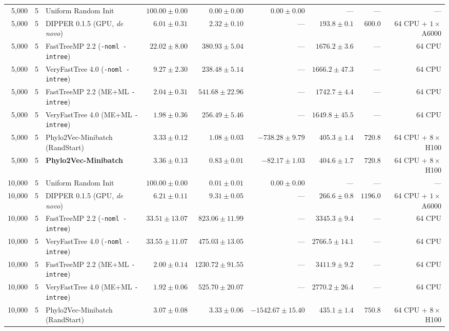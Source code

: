 \begin{table}[!htbp]
{\begin{tabular}{@{}rrlrrrrrr@{}}
\midrule
5,000 & 5 & Uniform Random Init & $100.00 \pm 0.00$ & $0.00 \pm 0.00$ & $0.00 \pm 0.00$ & --- & --- & ---\\
5,000 & 5 & DIPPER 0.1.5 (GPU, \textit{de novo}) & $6.01 \pm 0.31$ & $2.32 \pm 0.10$ & --- & $193.8 \pm 0.1$ & $600.0$ & 64 CPU + $1\times$ A6000\\
5,000 & 5 & FastTreeMP 2.2 (\texttt{-noml -intree}) & $22.02 \pm 8.00$ & $380.93 \pm 5.04$ & --- & $1676.2 \pm 3.6$ & --- & 64 CPU\\
5,000 & 5 & VeryFastTree 4.0 (\texttt{-noml -intree}) & $9.27 \pm 2.30$ & $238.48 \pm 5.14$ & --- & $1666.2 \pm 47.3$ & --- & 64 CPU\\
5,000 & 5 & FastTreeMP 2.2 (ME+ML \texttt{-intree}) & $2.04 \pm 0.31$ & $541.68 \pm 22.96$ & --- & $1742.7 \pm 4.4$ & --- & 64 CPU\\
5,000 & 5 & VeryFastTree 4.0 (ME+ML \texttt{-intree}) & $\mathbf{1.98 \pm 0.36}$ & $256.49 \pm 5.46$ & --- & $1649.8 \pm 45.5$ & --- & 64 CPU\\
5,000 & 5 & Phylo2Vec-Minibatch (RandStart) & $3.33 \pm 0.12$ & $1.08 \pm 0.03$ & $-738.28 \pm 9.79$ & $405.3 \pm 1.4$ & $720.8$ & 64 CPU + $8\times$ H100\\
5,000 & 5 & \textbf{Phylo2Vec-Minibatch} & $3.36 \pm 0.13$ & $\mathbf{0.83 \pm 0.01}$ & $-82.17 \pm 1.03$ & $404.6 \pm 1.7$ & $720.8$ & 64 CPU + $8\times$ H100\\
\midrule
10,000 & 5 & Uniform Random Init & $100.00 \pm 0.00$ & $0.01 \pm 0.01$ & $0.00 \pm 0.00$ & --- & --- & ---\\
10,000 & 5 & DIPPER 0.1.5 (GPU, \textit{de novo}) & $6.21 \pm 0.11$ & $9.31 \pm 0.05$ & --- & $266.6 \pm 0.8$ & $1196.0$ & 64 CPU + $1\times$ A6000\\
10,000 & 5 & FastTreeMP 2.2 (\texttt{-noml -intree}) & $33.51 \pm 13.07$ & $823.06 \pm 11.99$ & --- & $3345.3 \pm 9.4$ & --- & 64 CPU\\
10,000 & 5 & VeryFastTree 4.0 (\texttt{-noml -intree}) & $33.55 \pm 11.07$ & $475.03 \pm 13.05$ & --- & $2766.5 \pm 14.1$ & --- & 64 CPU\\
10,000 & 5 & FastTreeMP 2.2 (ME+ML \texttt{-intree}) & $2.00 \pm 0.14$ & $1230.72 \pm 91.55$ & --- & $3411.9 \pm 9.2$ & --- & 64 CPU\\
10,000 & 5 & VeryFastTree 4.0 (ME+ML \texttt{-intree}) & $\mathbf{1.92 \pm 0.06}$ & $525.70 \pm 20.07$ & --- & $2770.2 \pm 26.4$ & --- & 64 CPU\\
10,000 & 5 & Phylo2Vec-Minibatch (RandStart) & $3.07 \pm 0.08$ & $3.33 \pm 0.06$ & $-1542.67 \pm 15.40$ & $435.1 \pm 1.4$ & $750.8$ & 64 CPU + $8\times$ H100\\

\end{tabular}}
\end{table}
